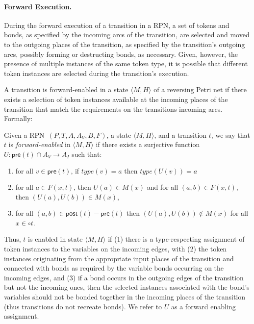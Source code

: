 \documentclass[runningheads]{llncs}
\newcommand{\PN}{reversing Petri net }
\newcommand{\guard}[1]{\mathsf{pre}(#1)}
\newcommand{\effects}[1]{\mathsf{post}(#1)}
\newcommand{\state}[2]{\langle {#1}, {#2}\rangle}
\newcommand{\RPN}{\textsc{RPN\ }}
\newcommand{\type}{\mathit{type}}
\begin{document}
\paragraph{Forward Execution.}
During the forward execution of a transition in a RPN, 
a set of tokens and bonds, as specified by the incoming arcs of the transition, are selected and
moved to the outgoing places of the transition, as specified by the transition's outgoing arcs, possibly
forming or destructing bonds, as necessary. Given, however, the presence of multiple instances of the same token
type, it is possible that different token instances are selected during the transition's execution.  


A transition is forward-enabled in a state $\state{M}{H}$ of a \PN if there exists a selection of token instances 
available at the incoming places of the transition that 
match the requirements  on the transitions incoming arcs. Formally:

\begin{definition}\label{fenabled}{\rm
		Given a \RPN $(P,T, A, A_V, B, F)$, a state $\state{M}{H}$, and a transition $t$, we say that $t$ is 
		\emph{forward-enabled} in $\state{M}{H}$  if there exists a surjective function 
		$U:\guard{t}\cap A_V\rightarrow A_I$ such that:
		
		\begin{enumerate}
			\item  for all $v\in\guard{t}$, if $\type(v) = a$	then $\type(U(v))=a$
			\item for all $a\in F(x,t)$, then $U(a)\in M(x)$ and for all $(a,b)\in F(x,t)$, then $(U(a),U(b))\in M(x)$, 
			\item for all
			$(a,b)\in \effects{t}-\guard{t}$ then $(U(a),U(b))\not\in M(x)$ for all $x\in\circ t$.
		\end{enumerate}
}\end{definition}

Thus, $t$ is enabled in state $\state{M}{H}$ if  (1) there is a type-respecting assignment of token instances
to the variables on the incoming edges, with (2) the token instances originating from the appropriate
input places of the transition and  connected with
bonds as required by the variable bonds occurring on the incoming edges, and (3) if a bond
occurs in the outgoing edges of the transition but not the incoming ones, then the selected instances
associated with the bond's variables should not be bonded together in the incoming places
of the transition (thus transitions do not recreate bonds). We refer to $U$ as a forward enabling 
assignment.
\end{document}
